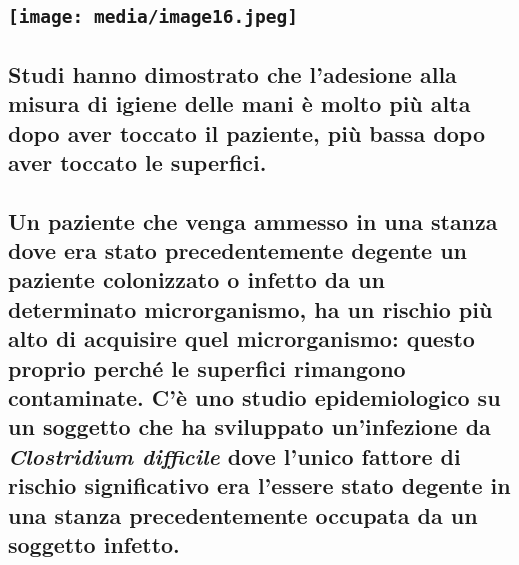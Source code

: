 \documentclass[]{article}
\begin{document}
\subsection{\texorpdfstring{\protect\texttt{[image: media/image16.jpeg]}}{}}\label{section-8}

\subsection{Studi hanno dimostrato che l'adesione alla misura di igiene
delle mani è molto più alta dopo aver toccato il paziente, più bassa
dopo aver toccato le
superfici.}\label{studi-hanno-dimostrato-che-ladesione-alla-misura-di-igiene-delle-mani-uxe8-molto-piuxf9-alta-dopo-aver-toccato-il-paziente-piuxf9-bassa-dopo-aver-toccato-le-superfici.}

\subsection{\texorpdfstring{Un paziente che venga ammesso in una stanza
dove era stato precedentemente degente un paziente colonizzato o infetto
da un determinato microrganismo, ha un rischio più alto di acquisire
quel microrganismo: questo proprio perché le superfici rimangono
contaminate. C'è uno studio epidemiologico su un soggetto che ha
sviluppato un'infezione da \emph{Clostridium difficile} dove l'unico
fattore di rischio significativo era l'essere stato degente in una
stanza precedentemente occupata da un soggetto
infetto.}{Un paziente che venga ammesso in una stanza dove era stato precedentemente degente un paziente colonizzato o infetto da un determinato microrganismo, ha un rischio più alto di acquisire quel microrganismo: questo proprio perché le superfici rimangono contaminate. C'è uno studio epidemiologico su un soggetto che ha sviluppato un'infezione da Clostridium difficile dove l'unico fattore di rischio significativo era l'essere stato degente in una stanza precedentemente occupata da un soggetto infetto.}}\label{un-paziente-che-venga-ammesso-in-una-stanza-dove-era-stato-precedentemente-degente-un-paziente-colonizzato-o-infetto-da-un-determinato-microrganismo-ha-un-rischio-piuxf9-alto-di-acquisire-quel-microrganismo-questo-proprio-perchuxe9-le-superfici-rimangono-contaminate.-cuxe8-uno-studio-epidemiologico-su-un-soggetto-che-ha-sviluppato-uninfezione-da-clostridium-difficile-dove-lunico-fattore-di-rischio-significativo-era-lessere-stato-degente-in-una-stanza-precedentemente-occupata-da-un-soggetto-infetto.}
\end{document}
